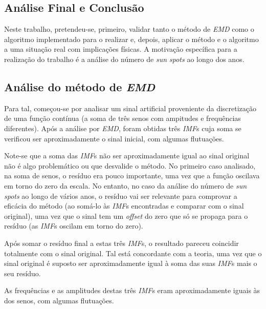 \documentclass[letterpaper]{article}
\begin{document}
\begin{multicols}{2}

\section{Análise Final e Conclusão}

\par Neste trabalho, pretendeu-se, primeiro, validar tanto o método de \textit{EMD} como o algoritmo implementado para o realizar e, depois, aplicar o método e o algoritmo a uma situação real com implicações físicas. A motivação específica para a realização do trabalho é a análise do número de \textit{sun spots} ao longo dos anos.

\subsection{Análise do método de \textit{EMD}}

\par Para tal, começou-se por analisar um sinal artificial proveniente da discretização de uma função contínua (a soma de três senos com ampitudes e frequências diferentes). Após a análise por \textit{EMD}, foram obtidas três \textit{IMF}s cuja soma se verificou ser aproximadamente o sinal inicial, com algumas flutuações. 

\par Note-se que a soma das \textit{IMF}s não ser aproximadamente igual ao sinal original não é algo problemático ou que desvalide o método. No primeiro caso analisado, na soma de senos, o resíduo era pouco importante, uma vez que a função oscilava em torno do zero da escala. No entanto, no caso da análise do número de \textit{sun spots} ao longo de vários anos, o resíduo vai ser relevante para comprovar a eficácia do método (ao somá-lo às \textit{IMF}s encontradas e comparar com o sinal original), uma vez que o sinal tem um \textit{offset} do zero que só se propaga para o resíduo (as \textit{IMF}s oscilam em torno do zero).

\par Após somar o resíduo final a estas três \textit{IMF}s, o resultado pareceu coincidir totalmente com o sinal original. Tal está concordante com a teoria, uma vez que o sinal original é suposto ser aproximadamente igual à soma das suas \textit{IMF}s mais o seu resíduo.

\par As frequências e as amplitudes destas três \textit{IMF}s eram aproximadamente iguais às dos senos, com algumas flutuações.


\end{multicols}
\end{document}
